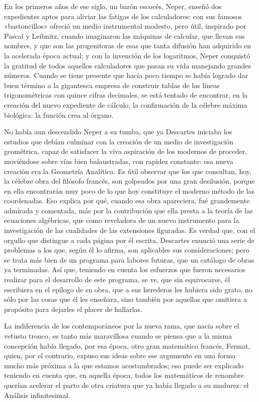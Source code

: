 \documentclass[a4paper, 12pt, draft]{article}
\begin{document}
{En los primeros años de ese siglo, un barón escocés, Neper, enseñó dos expedientes aptos para aliviar las fatigas de los calculadores: con sus famosos «bastoncillos» ofreció un medio instrumental modesto, pero útil, inspirado por Pascal y Leibnitz, cuando imaginaron las máquinas de calcular, que llevan sus nombres, y que son las progenitoras de esas que tanta difusión han adquirido en la acelerada época actual; y con la invención de los logaritmos, Neper conquistó la gratitud de todos aquellos calculadores que pasan su vida manejando grandes números. Cuando se tiene presente que hacía poco tiempo se había logrado dar buen término a la gigantesca empresa de construir tablas de las líneas trigonométricas con quince cifras decimales, se está tentado de encontrar, en la creación del nuevo expediente de cálculo, la confirmación de la célebre máxima biológica: la función crea al órgano.

No había aun descendido Neper a su tumba, que ya Descartes iniciaba los estudios que debían culminar con la creación de un medio de investigación geométrica, capaz de satisfacer la viva aspiración de los modernos de proceder, moviéndose sobre vías bien balaustradas, con rapidez constante: esa nueva creación era la Geometría Analítica. Es útil observar que los que consultan, hoy, la célebre obra del filósofo francés, son golpeados por una gran desilusión, porque en ella encontrarán muy poco de lo que hoy constituye el moderno método de las coordenadas. Eso explica por qué, cuando esa obra apareciera, fué grandemente admirada y comentada, más por la contribución que ella presta a la teoría de las ecuaciones algébricas, que como reveladora de un nuevo instrumento para la investigación de las cualidades de las extensiones figuradas. Es verdad que, con el orgullo que distingue a cada página por él escrita, Descartes enunció una serie de problemas a los que, según él lo afirma, son aplicables sus consideraciones; pero se trata más bien de un programa para labores futuras, que un catálogo de obras ya terminadas. Así que, teniendo en cuenta los esfuerzos que fueron necesarios realizar para el desarrollo de este programa, se ve, que sin equivocarse, él escribiera en el epílogo de su obra, que a sus herederos les hubiera sido grato, no sólo por las cosas que él les enseñara, sino también por aquellas que omitiera a propósito para dejarles el placer de hallarlas.

La indiferencia de los contemporáneos por la nueva rama, que nacía sobre el vetusto tronco, es tanto más maravillosa cuando se piensa que a la misma concepción había llegado, por esa época, otro gran matemático francés, Fermat, quien, por el contrario, expuso sus ideas sobre ese argumento en una forma mucho más próxima a la que estamos acostumbrados; eso puede ser explicado teniendo en cuenta que, en aquella época, todos los matemáticos
de renombre querían acelerar el parto de otra criatura que ya había llegado a su madurez: el Análisis infinitesimal.

}
\end{document}
